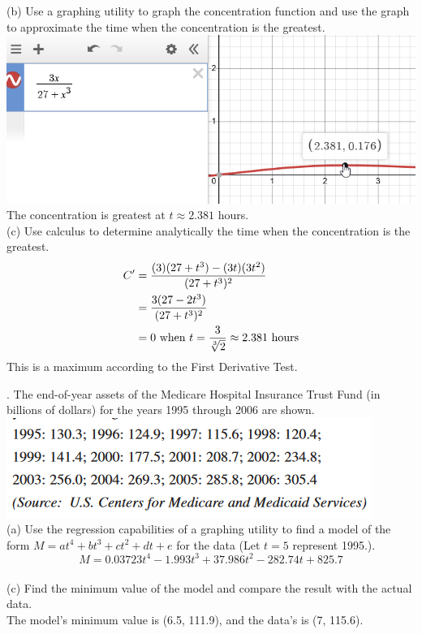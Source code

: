 \documentclass[11pt]{article}
\newcommand*{\vs}{\vspace{1cm}}
\newcommand*{\next}{\noindent}
\newcommand*{\set}{\setcounter{equation}{0}}
\begin{document}
\next
(b) Use a graphing utility to graph the concentration function and use the graph to approximate the time when the concentration is the greatest.\\
\includegraphics[scale=0.5]{82.png}\\
The concentration is greatest at $t\approx 2.381$ hours.\\

\next
(c) Use calculus to determine analytically the time when the concentration is the greatest.
\begin{align}
    \set
    C'&=\frac{(3)(27+t^3)-(3t)(3t^2)}{(27+t^3)^2}\\
    &=\frac{3(27-2t^3)}{(27+t^3)^2}\\
    &=0\,\,\text{when}\,\, t=\frac{3}{\sqrt[3]{2}}\approx 2.381\,\,\text{hours}
\end{align}
This is a maximum according to the First Derivative Test.

\vs
\next
88. The end-of-year assets of the Medicare Hospital Insurance Trust Fund (in billions of dollars) for the years 1995 through 2006 are shown.\\
\includegraphics{88.png}\\
(a) Use the regression capabilities of a graphing utility to find a model of the form $M=at^4+bt^3+ct^2+dt+e$ for the data (Let $t=5$ represent 1995.).
\[M=0.03723t^4-1.993t^3+37.986t^2-282.74t+825.7\]\\
(c) Find the minimum value of the model and compare the result with the actual data.\\
\indent The model's minimum value is (6.5, 111.9), and the data's is (7, 115.6).
\end{document}
